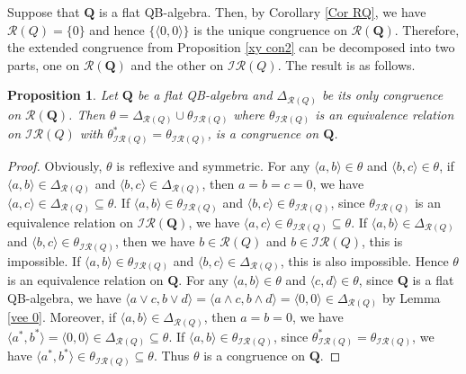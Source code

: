 \documentclass[12pt]{amsart}
\newtheorem{proposition}{Proposition}[section]
\theoremstyle{definition}
\theoremstyle{remark}
\numberwithin{equation}{section}
\begin{document}
Suppose that $\mathbf{Q}$ is a flat QB-algebra. Then, by Corollary \ref{Cor RQ}, we have $\mathscr{R}(Q)=\{0\}$ and hence $\{\langle 0,0\rangle\}$ is the unique congruence on
$\mathscr{R}({\mathbf{Q}})$. Therefore,  the extended congruence from Proposition \ref{xy con2} can be decomposed into two parts, one on $\mathscr{R}({\mathbf{Q}})$ and the other  on
$\mathscr{IR}({Q})$. The result is as follows.

\begin{proposition}\label{p5.3}
Let $\mathbf{Q}$ be a flat QB-algebra and $\Delta_{\mathscr{R}(Q)}$ be its only congruence on $\mathscr{R}({\mathbf{Q}})$. Then $\theta=\Delta_{\mathscr{R}(Q)}\cup \theta_{\mathscr{IR}(Q)}$ where $\theta_{\mathscr{IR}(Q)}$ is an equivalence relation on $\mathscr{IR}({Q})$ with $\theta_{\mathscr{IR}(Q)}^{\ast}=\theta_{\mathscr{IR}(Q)}$, is a congruence on $\mathbf{Q}$.
\end{proposition}

\begin{proof}
Obviously, $\theta$ is reflexive and symmetric. For any $\langle a,b\rangle\in \theta$ and $\langle b,c\rangle\in \theta$, if $\langle a,b\rangle\in \Delta_{\mathscr{R}(Q)}$ and $\langle b,c\rangle\in \Delta_{\mathscr{R}(Q)}$, then $a=b=c=0$, we have $\langle a,c\rangle\in \Delta_{\mathscr{R}(Q)}\subseteq \theta$. If $\langle a,b\rangle\in \theta_{\mathscr{IR}(Q)}$ and $\langle b,c\rangle\in \theta_{\mathscr{IR}(Q)}$, since $\theta_{\mathscr{IR}(Q)}$ is an equivalence relation on $\mathscr{IR}({\mathbf{Q}})$, we have $\langle a,c\rangle\in \theta_{\mathscr{IR}(Q)}\subseteq \theta$. If $\langle a,b\rangle\in \Delta_{\mathscr{R}(Q)}$ and $\langle b,c\rangle\in \theta_{\mathscr{IR}(Q)}$, then we have $b\in \mathscr{R}(Q)$ and $b\in \mathscr{IR}(Q)$, this is impossible. If $\langle a,b\rangle\in \theta_{\mathscr{IR}(Q)}$ and $\langle b,c\rangle\in \Delta_{\mathscr{R}(Q)}$, this is also impossible. Hence $\theta$ is an equivalence relation on $\mathbf{Q}$. For any $\langle a,b\rangle\in \theta$ and $\langle c,d\rangle\in \theta$, since $\mathbf{Q}$ is a flat QB-algebra, we have $\langle a\vee c,b\vee d\rangle=\langle a\wedge c,b\wedge d\rangle=\langle 0,0\rangle\in \Delta_{\mathscr{R}(Q)}$ by Lemma \ref{vee 0}. Moreover, if $\langle a,b\rangle\in \Delta_{\mathscr{R}(Q)}$, then $a=b=0$, we have $\langle a^{\ast},b^{\ast}\rangle=\langle 0,0\rangle\in \Delta_{\mathscr{R}(Q)}\subseteq \theta$. If $\langle a,b\rangle\in \theta_{\mathscr{IR}(Q)}$, since $\theta_{\mathscr{IR}(Q)}^{\ast}=\theta_{\mathscr{IR}(Q)}$, we have $\langle a^{\ast},b^{\ast}\rangle\in \theta_{\mathscr{IR}(Q)}\subseteq \theta$. Thus $\theta$ is a congruence on $\mathbf{Q}$.
\end{proof}
\end{document}
